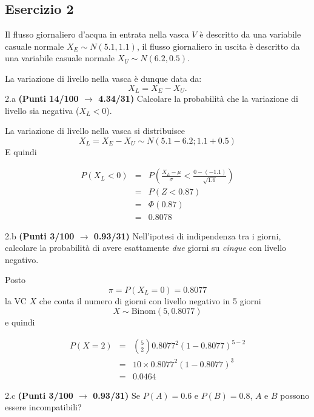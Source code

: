 \documentclass[
  11pt,
]{book}
\theoremstyle{mytheoremstyle}
\theoremstyle{mydefstyle}
\newenvironment{sol}
  {
  \begin{tcolorbox}[enhanced,breakable,arc=0.1mm,boxrule=1pt,colback=white,colframe=iblue,
  title=\bf \fontfamily{lmss}\selectfont \hspace{.5 cm} Soluzione,drop fuzzy shadow]

}{
\end{tcolorbox}
  }
\begin{document}
\subsection{Esercizio 2}\label{esercizio-2-5}

Il flusso giornaliero d'acqua in entrata nella vasca \(V\) è descritto da una variabile casuale normale \(X_E\sim N(5.1,1.1)\), il flusso giornaliero in uscita è descritto da una variabile casuale normale \(X_U\sim N(6.2,0.5)\).

La variazione di livello nella vasca è dunque data da:
\[
X_L=X_E-X_U.
\]
2.a \textbf{(Punti 14/100 \(\rightarrow\) 4.34/31)} Calcolare la probabilità che la variazione di livello sia negativa (\(X_L<0\)).

\begin{sol}
La variazione di livello nella vasca si distribuisce
\[
X_L=X_E-X_U\sim N(5.1-6.2;1.1+0.5)
\]
E quindi

\begin{eqnarray*}
      P( X_L   <   0 ) 
        &=& P\left(  \frac { X_L  -  \mu }{ \sigma }  <  \frac { 0  -  ( -1.1 ) }{\sqrt{ 1.6 }} \right)  \\
                 &=& P\left(  Z   <   0.87 \right) \\    
                 &=&  \Phi( 0.87 ) \\ &=&  0.8078 
      \end{eqnarray*}

\end{sol}

2.b \textbf{(Punti 3/100 \(\rightarrow\) 0.93/31)} Nell'ipotesi di indipendenza tra i giorni, calcolare la probabilità di avere esattamente \emph{due} giorni su \emph{cinque} con livello negativo.

\begin{sol}
Posto
\[
\pi = P(X_L=0)=0.8077
\]
la VC \(X\) che conta il numero di giorni con livello negativo in 5 giorni
\[
X\sim\text{Binom}(5,0.8077)
\]
e quindi

\normalsize 
\begin{eqnarray*}
      P( X = 2 ) &=& \binom{ 5 }{ 2 } 0.8077 ^{ 2 }(1- 0.8077 )^{ 5 - 2 } \\                 &=& 10 \times 0.8077 ^{ 2 }(1- 0.8077 )^{ 3 } \\                 &=& 0.0464 
   \end{eqnarray*}
\normalsize 

\end{sol}

2.c \textbf{(Punti 3/100 \(\rightarrow\) 0.93/31)} Se \(P(A)=0.6\) e \(P(B)=0.8\), \(A\) e \(B\) possono essere incompatibili?
\end{document}
